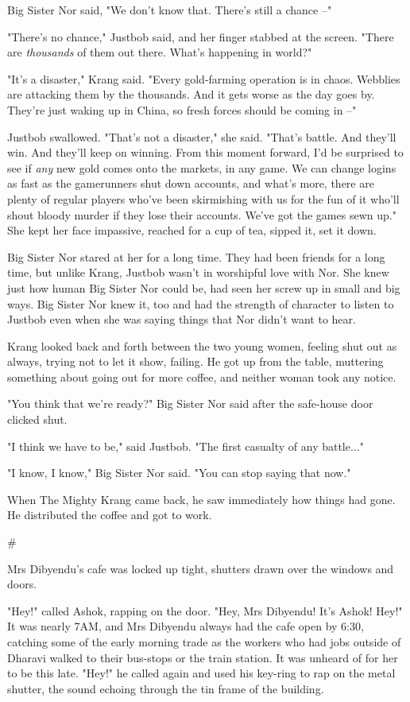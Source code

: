 Big Sister Nor said, "We don't know that. There's still a chance
--"

"There's no chance," Justbob said, and her finger stabbed at the
screen. "There are \emph{thousands} of them out there. What's
happening in world?"

"It's a disaster," Krang said. "Every gold-farming operation is in
chaos. Webblies are attacking them by the thousands. And it gets
worse as the day goes by. They're just waking up in China, so fresh
forces should be coming in --"

Justbob swallowed. "That's not a disaster," she said. "That's
battle. And they'll win. And they'll keep on winning. From this
moment forward, I'd be surprised to see if \emph{any} new gold
comes onto the markets, in any game. We can change logins as fast
as the gamerunners shut down accounts, and what's more, there are
plenty of regular players who've been skirmishing with us for the
fun of it who'll shout bloody murder if they lose their accounts.
We've got the games sewn up." She kept her face impassive, reached
for a cup of tea, sipped it, set it down.

Big Sister Nor stared at her for a long time. They had been friends
for a long time, but unlike Krang, Justbob wasn't in worshipful
love with Nor. She knew just how human Big Sister Nor could be, had
seen her screw up in small and big ways. Big Sister Nor knew it,
too and had the strength of character to listen to Justbob even
when she was saying things that Nor didn't want to hear.

Krang looked back and forth between the two young women, feeling
shut out as always, trying not to let it show, failing. He got up
from the table, muttering something about going out for more
coffee, and neither woman took any notice.

"You think that we're ready?" Big Sister Nor said after the
safe-house door clicked shut.

"I think we have to be," said Justbob. "The first casualty of any
battle..."

"I know, I know," Big Sister Nor said. "You can stop saying that
now."

When The Mighty Krang came back, he saw immediately how things had
gone. He distributed the coffee and got to work.

\#

Mrs Dibyendu's cafe was locked up tight, shutters drawn over the
windows and doors.

"Hey!" called Ashok, rapping on the door. "Hey, Mrs Dibyendu! It's
Ashok! Hey!" It was nearly 7AM, and Mrs Dibyendu always had the
cafe open by 6:30, catching some of the early morning trade as the
workers who had jobs outside of Dharavi walked to their bus-stops
or the train station. It was unheard of for her to be this late.
"Hey!" he called again and used his key-ring to rap on the metal
shutter, the sound echoing through the tin frame of the building.

